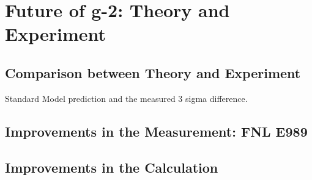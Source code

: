 \section{Future of g-2: Theory and Experiment}
\subsection{Comparison between Theory and Experiment}
Standard Model prediction and the measured 3 sigma difference.
\subsection{Improvements in the Measurement: FNL E989}
\subsection{Improvements in the Calculation}